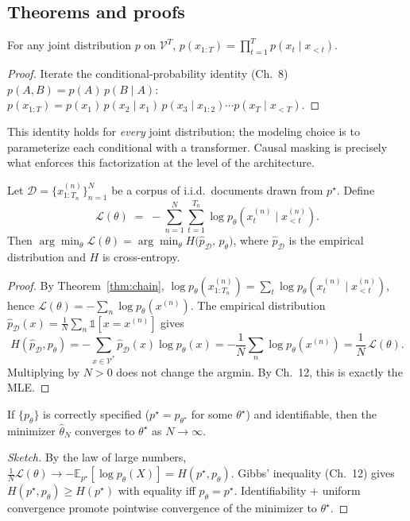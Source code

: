 \subsection*{Theorems and proofs}

\begin{theorem}\label{thm:chain}
For any joint distribution $p$ on $\mathcal{V}^T$, $p(x_{1:T}) = \prod_{t=1}^T p(x_t \mid x_{<t})$.
\end{theorem}
\begin{proof}
Iterate the conditional-probability identity (Ch.~8) $p(A,B) = p(A)\,p(B\mid A)$:
$p(x_{1:T}) = p(x_1)\,p(x_2\mid x_1)\,p(x_3\mid x_{1:2})\cdots p(x_T\mid x_{<T})$.
\end{proof}

This identity holds for \emph{every} joint distribution; the modeling choice is to parameterize each conditional with a transformer. Causal masking is precisely what enforces this factorization at the level of the architecture.

\begin{theorem}[NTP loss = empirical NLL = cross-entropy with $\hat p_{\mathcal{D}}$]\label{thm:ntp}
Let $\mathcal{D} = \{x^{(n)}_{1:T_n}\}_{n=1}^{N}$ be a corpus of i.i.d.\ documents drawn from $p^\star$. Define
\[
  \mathcal{L}(\theta) \;=\; -\sum_{n=1}^{N}\sum_{t=1}^{T_n} \log p_\theta\!\left(x^{(n)}_t \mid x^{(n)}_{<t}\right).
\]
Then $\arg\min_\theta \mathcal{L}(\theta) = \arg\min_\theta H\!\big(\hat p_{\mathcal{D}},\, p_\theta\big)$, where $\hat p_{\mathcal{D}}$ is the empirical distribution and $H$ is cross-entropy.
\end{theorem}
\begin{proof}
By Theorem~\ref{thm:chain}, $\log p_\theta(x_{1:T_n}^{(n)}) = \sum_t \log p_\theta(x_t^{(n)}\mid x_{<t}^{(n)})$, hence $\mathcal{L}(\theta) = -\sum_n \log p_\theta(x^{(n)})$. The empirical distribution $\hat p_{\mathcal{D}}(x) = \frac{1}{N}\sum_n \mathbb{1}[x = x^{(n)}]$ gives
\[
  H(\hat p_{\mathcal{D}}, p_\theta) = -\!\!\sum_{x\in\mathcal{V}^*}\hat p_{\mathcal{D}}(x)\log p_\theta(x) = -\frac{1}{N}\sum_n \log p_\theta(x^{(n)}) = \frac{1}{N}\,\mathcal{L}(\theta).
\]
Multiplying by $N>0$ does not change the argmin. By Ch.~12, this is exactly the MLE.
\end{proof}

\begin{corollary}[Consistency]
If $\{p_\theta\}$ is correctly specified ($p^\star = p_{\theta^\star}$ for some $\theta^\star$) and identifiable, then the minimizer $\hat\theta_N$ converges to $\theta^\star$ as $N\to\infty$.
\end{corollary}
\begin{proof}[Sketch]
By the law of large numbers, $\frac{1}{N}\mathcal{L}(\theta) \to -\mathbb{E}_{p^\star}\!\left[\log p_\theta(X)\right] = H(p^\star, p_\theta)$. Gibbs' inequality (Ch.~12) gives $H(p^\star, p_\theta)\ge H(p^\star)$ with equality iff $p_\theta = p^\star$. Identifiability + uniform convergence promote pointwise convergence of the minimizer to $\theta^\star$.
\end{proof}

